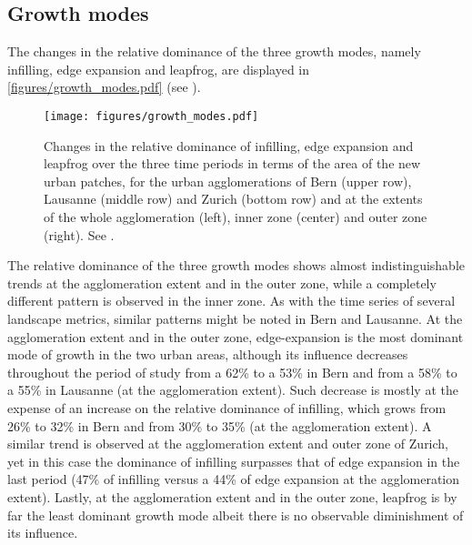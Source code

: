   
\subsection*{Growth modes}

The changes in the relative dominance of the three growth modes, namely infilling, edge expansion and leapfrog, are displayed in \autoref{figures/growth_modes.pdf} (see ).

\begin{figure}[!ht]
  \begin{adjustwidth}{0cm}{-.4\textwidth}
    \centering

    \texttt{[image: figures/growth\_modes.pdf]}
    
    \caption[Three growth modes]{\label{figures/growth_modes.pdf}Changes in the relative dominance of infilling, edge expansion and leapfrog over the three time periods in terms of the area of the new urban patches, for the urban agglomerations of Bern (upper row), Lausanne (middle row) and Zurich (bottom row) and at the extents of the whole agglomeration (left), inner zone (center) and outer zone (right). See .}
  \end{adjustwidth}
\end{figure}

The relative dominance of the three growth modes shows almost indistinguishable trends at the agglomeration extent and in the outer zone, while a completely different pattern is observed in the inner zone.
As with the time series of several landscape metrics, similar patterns might be noted in Bern and Lausanne. At the agglomeration extent and in the outer zone, edge-expansion is the most dominant mode of growth in the two urban areas, although its influence decreases throughout the period of study from a 62\% to a 53\% in Bern and from a 58\% to a 55\% in Lausanne (at the agglomeration extent). Such decrease is mostly at the expense of an increase on the relative dominance of infilling, which grows from 26\% to 32\% in Bern and from 30\% to 35\% (at the agglomeration extent).
A similar trend is observed at the agglomeration extent and outer zone of Zurich, yet in this case the dominance of infilling surpasses that of edge expansion in the last period (47\% of infilling versus a 44\% of edge expansion at the agglomeration extent).
Lastly, at the agglomeration extent and in the outer zone, leapfrog is by far the least dominant growth mode albeit there is no observable diminishment of its influence.

